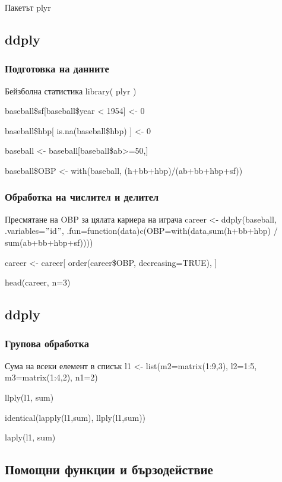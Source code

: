 \documentclass{beamer}
\begin{document}
\begin{frame}
\center \huge{Пакетът plyr}
\end{frame}

\subsection{ddply}

\begin{frame}
\frametitle{Подготовка на данните}
\begin{block}{Бейзболна статистика}
library( plyr )

baseball\$sf[baseball\$year < 1954] <- 0

baseball\$hbp[ is.na(baseball\$hbp) ] <- 0

baseball <- baseball[baseball\$ab>=50,]

baseball\$OBP <- with(baseball, (h+bb+hbp)/(ab+bb+hbp+sf))
\end{block}
\end{frame}

\begin{frame}
\frametitle{Обработка на числител и делител}
\begin{block}{Пресмятане на OBP за цялата кариера на играча}
career <- ddply(baseball, .variables=$"$id$"$, .fun=function(data){c(OBP=with(data,sum(h+bb+hbp) / sum(ab+bb+hbp+sf)))})

career <- career[ order(career\$OBP, decreasing=TRUE), ]

head(career, n=3)
\end{block}
\end{frame}

\subsection{ddply}

\begin{frame}
\frametitle{Групова обработка}
\begin{block}{Сума на всеки елемент в списък}
l1 <- list(m2=matrix(1:9,3), l2=1:5, m3=matrix(1:4,2), n1=2)

llply(l1, sum)

identical(lapply(l1,sum), llply(l1,sum))

laply(l1, sum)
\end{block}
\end{frame}

\subsection{Помощни функции и бързодействие}
\end{document}
